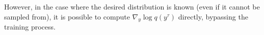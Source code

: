 \documentclass[letterpaper, 10 pt, conference]{IEEEconf}
\newtheorem{proposition}{Proposition}
\begin{document}
However, in the case where the desired distribution is known (even if it cannot be sampled from), it is possible to compute $\nabla_{y} \log{q(y^{\tau})}$ directly, bypassing the training process.
% 
% 
% 
\end{document}
